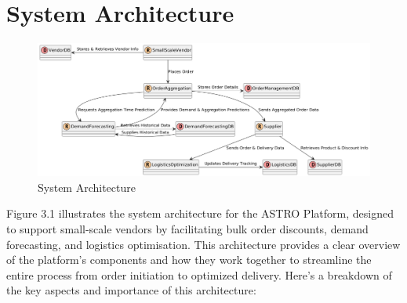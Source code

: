 
\chapter{System Architecture}


\begin{figure}[h]
    \centering
    \includegraphics[width=\textwidth]{Figures/system_arch.png}
    \caption{System Architecture}
    \label{fig:architecture}
\end{figure}

\noindent Figure 3.1 illustrates the system architecture for the ASTRO Platform, designed to support small-scale vendors by facilitating bulk order discounts, demand forecasting, and logistics optimisation. This architecture provides a clear overview of the platform’s components and how they work together to streamline the entire process from order initiation to optimized delivery. Here’s a breakdown of the key aspects and importance of this architecture:


